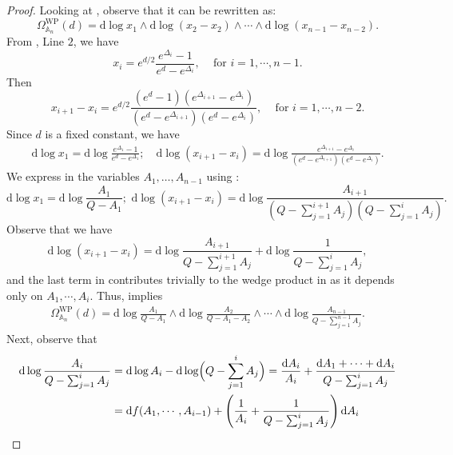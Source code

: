 \documentclass{amsart}
\theoremstyle{definition}
\begin{document}
\begin{proof}
Looking at , observe that it can be rewritten as:
\begin{equation}
\label{eq:vol-form-crown-chekhov-2}
\Omega^{\mathrm{WP}}_{\mathbb{A}_n}(d)  = \mathrm{d}\log x_1 \wedge \mathrm{d}\log (x_2-x_2)\wedge\cdots\wedge \mathrm{d}\log(x_{n-1}-x_{n-2}).
\end{equation}
From \cite[Page~10]{chekhov2024}, Line $2$, we have
\[
x_i = e^{d/2} \frac{e^{\Delta_i}-1}{e^{d}-e^{\Delta_i}}, \,\quad \text{for }i = 1, \cdots, n-1.
\]
Then 
\[
x_{i+1}-x_i =
e^{d/2}\frac{(e^d-1)(e^{\Delta_{i+1}}-e^{\Delta_{i}})}{(e^{d}-e^{\Delta_{i+1}})(e^{d}-e^{\Delta_{i}})}, \,\quad \text{for }i = 1, \cdots, n-2.
\]
Since $d$ is a fixed constant, we have
\begin{align}
\label{eq:dlogx}
\mathrm{d}\log x_1 =\mathrm{d}\log\frac{e^{\Delta_1}-1}{e^{d}-e^{\Delta_1}}; \quad  \mathrm{d}\log (x_{i+1}-x_i) = \mathrm{d}\log \frac{e^{\Delta_{i+1}}-e^{\Delta_{i}}}{(e^{d}-e^{\Delta_{i+1}})(e^{d}-e^{\Delta_{i}})}.
\end{align}
We express  in the variables $A_1,\dotsc,A_{n-1}$ using :
\[
\mathrm{d}\log x_1 = \mathrm{d}\log\frac{A_1}{Q-A_1}; \,\, \mathrm{d}\log (x_{i+1}-x_i) = \mathrm{d}\log \frac{A_{i+1}}{(Q-\sum_{j=1}^{i+1} A_j)(Q-\sum_{j=1}^i A_j)}.
\]
Observe that we have
\begin{equation}
\label{eq:dlog(x-x)}
\mathrm{d}\log (x_{i+1}-x_i) = \mathrm{d}\log \frac{A_{i+1}}{Q-\sum_{j=1}^{i+1} A_j} +\mathrm{d}\log \frac{1}{Q-\sum_{j=1}^{i} A_j},
\end{equation}
and the last term in  contributes trivially to the wedge product in  as it depends only on $A_1, \cdots, A_i$. Thus,  implies
\begin{align}
\label{eq:vol-form-crown-A-var-3}
\Omega^{\mathrm{WP}}_{\mathbb{A}_n}(d) = \mathrm{d}\log\frac{A_1}{Q-A_1} \wedge \mathrm{d}\log\frac{A_2}{Q-A_1-A_2} \wedge \cdots \wedge \mathrm{d}\log\frac{A_{n-1}}{Q-\sum_{j=1}^{n-1} A_j}. 
\end{align}
Next, observe that
\begin{align*}
\mathrm{d}\log \frac{A_i}{Q-\sum_{j=1}^{i} A_j} & = \mathrm{d}\log A_i - \mathrm{d}\log \Bigl(Q-\sum_{j=1}^{i} A_j\Bigr)= \frac{\mathrm{d}A_i}{A_i} + \frac{\mathrm{d}A_1+\cdots+\mathrm{d}A_i}{Q-\sum_{j=1}^{i} A_j}
\\ & = 
\mathrm{d}f(A_1,\cdots,A_{i-1})+  \left( \frac{1}{A_i}+ \frac{1}{Q-\sum_{j=1}^{i} A_j} \right)  \mathrm{d}A_i

\end{align*}
\end{proof}
\end{document}
